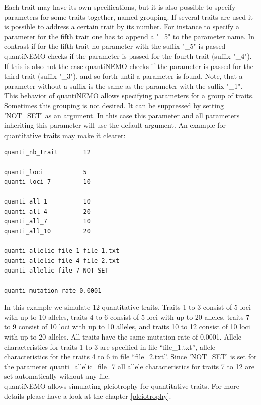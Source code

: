 \documentclass[letterpaper,12pt,oneside]{book}
\begin{document}
Each trait may have its own specifications, but it is also possible to specify parameters for some traits together, named grouping. If several traits are used it is possible to address a certain trait by its number. For instance to specify a parameter for the fifth trait one has to append a \textsf{"\_5"} to the parameter name. In contrast if for the fifth trait no parameter with the suffix \textsf{"\_5"} is passed quantiNEMO checks if the parameter is passed for the fourth trait (suffix \textsf{"\_4"}). If this is also not the case quantiNEMO checks if the parameter is passed for the third trait (suffix \textsf{"\_3"}), and so forth until a parameter is found. Note, that a parameter without a suffix is the same as the parameter with the suffix  \textsf{"\_1"}. This behavior of quantiNEMO allows specifying parameters for a group of traits. Sometimes this grouping is not desired. It can be suppressed by setting 'NOT\_SET' as an argument. In this case this parameter and all parameters inheriting this parameter will use the default argument. An example for quantitative traits may make it clearer:
\begin{lstlisting}[frame=single]
quanti_nb_trait       12
	
quanti_loci           5
quanti_loci_7         10

quanti_all_1          10
quanti_all_4          20
quanti_all_7          10
quanti_all_10         20

quanti_allelic_file_1 file_1.txt  
quanti_allelic_file_4 file_2.txt  
quanti_allelic_file_7 NOT_SET  

quanti_mutation_rate 0.0001
\end{lstlisting} 
In this example we simulate 12 quantitative traits. Traits 1 to 3 consist of 5 loci with up to 10 alleles, traits 4 to 6 consist of 5 loci with up to 20 alleles, traits 7 to 9 consist of 10 loci with up to 10 alleles, and traits 10 to 12 consist of 10 loci with up to 20 alleles. All traits have the same mutation rate of 0.0001. Allele characteristics for traits 1 to 3 are specified in file “file\_1.txt”, allele characteristics for the traits 4 to 6 in file “file\_2.txt”. Since 'NOT\_SET' is set for the parameter \textsf{ quanti\_allelic\_file\_7} all allele characteristics for traits 7 to 12 are set automatically without any file. \\

quantiNEMO allows simulating pleiotrophy for quantitative traits. For more details please have a look at the chapter \ref{pleiotrophy}.
\end{document}
